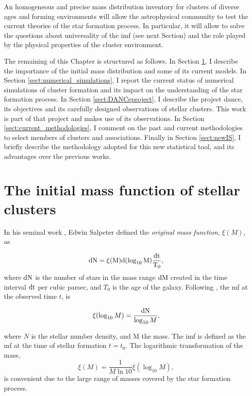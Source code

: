 An homogeneous and precise mass distribution inventory for clusters of diverse ages and forming environments will allow the astrophysical community to test the current theories of the star formation process. In particular, it will allow to solve the questions about universality of the \gls{imf} (see next Section) and the role played by the physical properties of the cluster environment.    

The remaining of this Chapter is structured as follows. In Section \ref{sect:IMF}, I describe the importance of the initial mass distribution and some of its current models. In Section \ref{sect:numerical_simulations}, I report the current status of numerical simulations of cluster formation and its impact on the understanding of the star formation process. In Section \ref{sect:DANCeproject}, I describe the project \gls{dance}, its objectives and its carefully designed observations of stellar clusters. This work is part of that project and makes use of its observations. In Section \ref{sect:current_methodologies}, I comment on the past and current methodologies to select members of clusters and associations. Finally in Section \ref{sect:newIS}, I briefly describe the methodology adopted for this new statistical tool, and its advantages over the previous works. 

\section{The initial mass function of stellar clusters}
\label{sect:IMF}

In his seminal work \citep{Salpeter1955}, Edwin Salpeter defined the \emph{original mass function}, $\xi(M)$, as

\begin{equation}
\rm{d}N= \xi(M)\rm{d}(\log_{10} M) \frac{\rm{d}t}{T_0},\nonumber
\end{equation}
where $\rm{d}N$ is the number of stars in the mass range $\rm{d}M$ created in the time interval $\rm{d}t$ per cubic parsec, and $T_0$ is the age of the galaxy. Following \citet{Chabrier2003b},  the \gls{mf} at the observed time $t$, is

\begin{equation}
\xi(\log_{10} M)=\frac{\rm{d}N}{\log_{10} M},\nonumber
\end{equation}

where $N$ is the stellar number density, and M the mass. The \gls{imf} is defined as the \gls{mf} at the time of stellar formation $t=t_0$. The logarithmic transformation of the mass,
\begin{equation}
\xi(M)=\frac{1}{M \ln 10} \xi (\log_{10} M),\nonumber
\end{equation}
is convenient due to the large range of masses covered by the star formation process.

